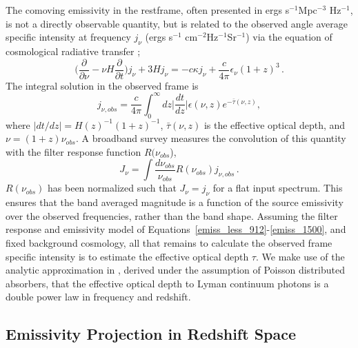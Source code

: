 \documentclass[fleqn,usenatbib]{mnras}
\begin{document}
The comoving emissivity in the restframe, often presented in ergs s$^{-1}$Mpc$^{-3}$ Hz$^{-1}$, is not a directly observable quantity, but is related to the observed angle average specific intensity at frequency $j_{\nu}$ (ergs s$^{-1}$ cm$^{-2}$Hz$^{-1}$Sr$^{-1}$) via the equation of cosmological radiative transfer \citep{1993ppc..book.....P};
\begin{equation}
\label{cosmo_transfer}
\bigg(\frac{\partial}{\partial \nu} - \nu H \frac{\partial}{\partial t} \bigg) j_\nu + 3H j_\nu = -c\kappa j_\nu + \frac{c}{4\pi} \epsilon_\nu (1+z)^3\,.
\end{equation} 
The integral solution in the observed frame is %
\begin{equation}
\label{specific_emiss}
j_{\nu, obs} = \frac{c}{4\pi} \int_{0}^{\infty} dz \bigg| \frac{dt}{dz} \bigg| \epsilon(\nu, z) e^{-\bar{\tau}(\nu, z)},
\end{equation}
where $|dt/dz| = H(z)^{-1} (1+z)^{-1}$, $\bar{\tau}(\nu, z)$ is the effective optical depth, and $\nu = (1+z)\nu_{obs}$. A broadband survey measures the convolution of this quantity with the filter response function $R(\nu_{obs}$),
\begin{equation}
\label{Big_J}
J_\nu = \int \frac{d\nu_{obs}}{\nu_{obs}} R(\nu_{obs}) j_{\nu, obs}\,.
\end{equation}
$R(\nu_{obs})$ has been normalized such that $J_\nu = j_\nu$ for a flat input spectrum. This ensures that the band averaged magnitude is a function of the source emissivity over the observed frequencies, rather than the band shape. Assuming the filter response and emissivity model of Equations~\ref{emiss_less_912}-\ref{emiss_1500}, and fixed background cosmology, all that remains to calculate the observed frame specific intensity is to estimate the effective optical depth $\tau$. We make use of the analytic approximation in \cite{madau2000intergalactic}, derived under the assumption of Poisson distributed absorbers, that the effective optical depth to Lyman continuum photons is a double power law in frequency and redshift.


\subsection{Emissivity Projection in Redshift Space} 
\end{document}
